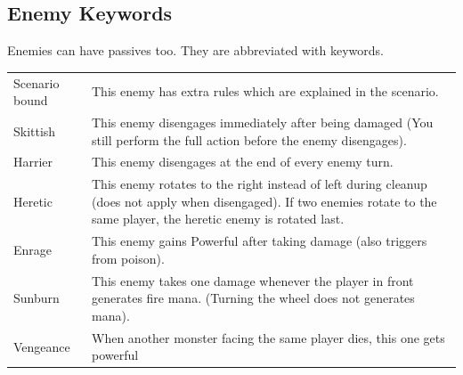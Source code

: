 
\subsection*{Enemy Keywords}
Enemies can have passives too. They are abbreviated with keywords.

\begin{longtable}{|p{2.5cm}|p{13.7cm}|}
	
	\hline
	Scenario bound & This enemy has extra rules which are explained in the scenario.\\
	Skittish & This enemy \symDisengage disengages immediately after being damaged (You still perform the full action before the enemy disengages).\\
	Harrier & This enemy \symDisengage disengages at the end of every enemy turn.\\
	Heretic & This enemy rotates to the right instead of left during cleanup (does not apply when disengaged). If two enemies rotate to the same player, the heretic enemy is rotated last. \\
	Enrage & This enemy gains \symPowerful Powerful after taking damage (also triggers from poison).\\
	Sunburn & This enemy takes one damage whenever the player in front generates fire mana. (Turning the wheel does not generates mana).\\
	Vengeance & When another monster facing the same player dies, this one gets powerful\\
	\hline 
	
\end{longtable}